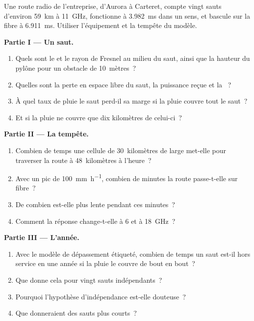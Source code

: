 \begin{problem}\label{pb:nw:long-haul-wireless:1}
Une route radio de l'entreprise, d'Aurora à Carteret, compte vingt sauts d'environ \qty{59}{\kilo\metre} à \qty{11}{\giga\hertz}, fonctionne à \qty{3.982}{\milli\second}
dans un sens, et bascule sur la fibre à \qty{6.911}{\milli\second}. Utiliser l'équipement et la tempête du modèle.

\medskip\noindent\textbf{Partie I --- Un saut.}
\begin{enumerate}
\item Quels sont le  et le rayon de Fresnel au milieu du saut, ainsi que la hauteur du pylône pour un obstacle de 10~mètres~?
\item Quelles sont la perte en espace libre du saut, la puissance reçue et la ~?
\item À quel taux de pluie le saut perd-il sa marge si la pluie couvre tout le saut~?
\item Et si la pluie ne couvre que dix kilomètres de celui-ci~?
\end{enumerate}

\medskip\noindent\textbf{Partie II --- La tempête.}
\begin{enumerate}[resume]
\item Combien de temps une cellule de 30~kilomètres de large met-elle pour traverser la route à 48~kilomètres à l'heure~?
\item Avec un pic de \qty{100}{\milli\metre\per\hour}, combien de minutes la route passe-t-elle sur fibre~?
\item De combien est-elle plus lente pendant ces minutes~?
\item Comment la réponse change-t-elle à 6 et à \qty{18}{\giga\hertz}~?
\end{enumerate}

\medskip\noindent\textbf{Partie III --- L'année.}
\begin{enumerate}[resume]
\item Avec le modèle de dépassement étiqueté, combien de temps un saut est-il hors service en une année si la pluie le couvre de bout en bout~?
\item Que donne cela pour vingt sauts indépendants~?
\item Pourquoi l'hypothèse d'indépendance est-elle douteuse~?
\item Que donneraient des sauts plus courts~?
\end{enumerate}


\end{problem}
